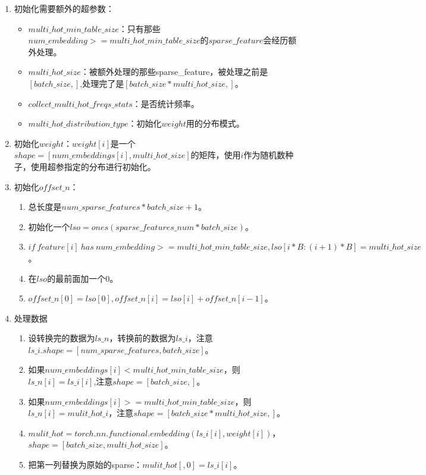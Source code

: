 \documentclass{article}
\begin{document}
\begin{enumerate}
    \item 初始化需要额外的超参数：
    \begin{itemize}
        \item $multi\_hot\_min\_table\_size$：只有那些$num\_embedding>=multi\_hot\_min\_table\_size$的$sparse\_feature$会经历额外处理。
        \item $multi\_hot\_size$：被额外处理的那些sparse\_feature，被处理之前是$[batch\_size,]$,处理完了是$[batch\_size*multi\_hot\_size,]$。
        \item $collect\_multi\_hot\_freqs\_stats$：是否统计频率。
        \item $multi\_hot\_distribution\_type$：初始化$weight$用的分布模式。
    \end{itemize}
    \item 初始化$weight$：$weight[i]$是一个$shape=[num\_embeddings[i], multi\_hot\_size]$的矩阵，使用$i$作为随机数种子，使用超参指定的分布进行初始化。
    \item 初始化$offset\_n$：
    \begin{enumerate}
        \item 总长度是$num\_sparse\_features*batch\_size+1$。
        \item 初始化一个$lso = ones(sparse\_features\_num * batch\_size)$。
        \item $if\ feature[i]\ has\ num\_embedding >= multi\_hot\_min\_table\_size, lso[i*B : (i+1)*B] = multi\_hot\_size$。
        \item 在$lso$的最前面加一个0。
        \item $offset\_n[0] = lso[0], offset\_n[i] = lso[i] + offset\_n[i-1]$。
    \end{enumerate} 
    \item 处理数据
    \begin{enumerate}
        \item 设转换完的数据为$ls\_n$，转换前的数据为$ls\_i$，注意$ls\_i.shape=[num\_sparse\_features, batch\_size]$。
        \item 如果$num\_embeddings[i]<multi\_hot\_min\_table\_size$，则$ls\_n[i] = ls\_i[i]$,注意$shape=[batch\_size,]$。
        \item 如果$num\_embeddings[i]>=multi\_hot\_min\_table\_size$，则$ls\_n[i] = mulit\_hot\_i$，注意$shape=[batch\_size*multi\_hot\_size,]$。
        \item $mulit\_hot = torch.nn.functional.embedding(ls\_i[i], weight[i])$，$shape=[batch\_size, multi\_hot\_size]$。
        \item 把第一列替换为原始的sparse：$mulit\_hot[,0] = ls\_i[i]$。

\end{enumerate}
\end{enumerate}
\end{document}
